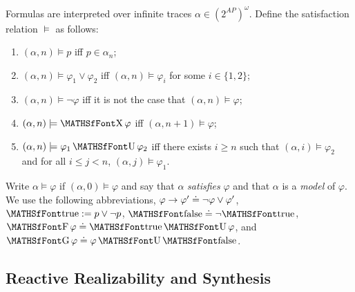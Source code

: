 	Formulas are interpreted over infinite traces $\alpha \in (2^{AP})^\omega$. Define the satisfaction relation
	$\models$ as follows:
	\begin{enumerate}
	\item  $(\alpha,n) \models p$ iff $p \in \alpha_n$;
	\item  $(\alpha,n) \models \varphi_1 \vee \varphi_2$ iff $(\alpha,n) \models \varphi_i$ for some $i \in \{1,2\}$;
	\item 	$(\alpha,n) \models \neg \varphi$ iff it is not the case that $(\alpha,n) \models \varphi$;
	\item   $(\alpha,n) \models \nextX \varphi$ iff $(\alpha,n+1) \models \varphi$;
	\item  $(\alpha,n) \models \varphi_1 \until \varphi_2$ iff there exists $i \geq n$ such that $(\alpha,i) \models \varphi_2$ and for all $i \leq j < n$, $(\alpha,j) \models \varphi_1$.
	\end{enumerate}
	Write $\alpha \models \varphi$ if $(\alpha,0) \models \varphi$ and say that $\alpha$ \emph{satisfies} $\varphi$ and that $\alpha$ is a \emph{model} of $\varphi$.
	We use the following abbreviations, $\varphi \to \varphi' \doteq \neg \varphi \vee \varphi'$, $\true := p \vee \neg p$, $\false \doteq \neg \true$, $\eventually \varphi \doteq \true \until \varphi$, and
	$\always \varphi \doteq \varphi \until \false$.
	


\subsection{Reactive Realizability and Synthesis} \label{sec:prelims:synthesis}

